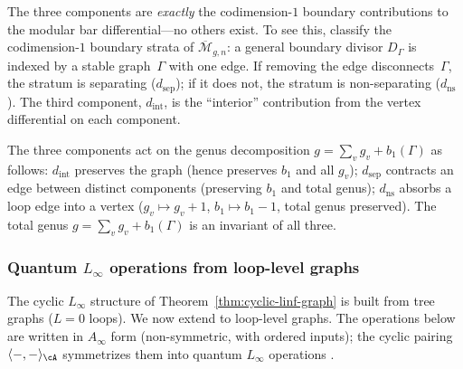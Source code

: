 \begin{remark}
\label{rem:genus-bookkeeping}
The three components are \emph{exactly} the codimension-$1$ boundary
contributions to the modular bar differential---no others exist.
To see this, classify the codimension-$1$ boundary strata of
$\overline{\mathcal{M}}_{g,n}$: a general boundary divisor $D_\Gamma$
is indexed by a stable graph~$\Gamma$ with one edge.
If removing the edge disconnects~$\Gamma$, the stratum is separating
($d_{\mathrm{sep}}$); if it does not, the stratum is non-separating
($d_{\mathrm{ns}}$).  The third component, $d_{\mathrm{int}}$, is
the ``interior'' contribution from the vertex differential on each
component.

The three components act on the genus decomposition
$g = \sum_v g_v + b_1(\Gamma)$ as follows:
$d_{\mathrm{int}}$ preserves the graph
(hence preserves $b_1$ and all $g_v$);
$d_{\mathrm{sep}}$ contracts an edge between distinct components
(preserving $b_1$ and total genus);
$d_{\mathrm{ns}}$ absorbs a loop edge into a vertex
($g_v \mapsto g_v + 1$, $b_1 \mapsto b_1 - 1$, total
genus preserved).
The total genus $g = \sum_v g_v + b_1(\Gamma)$ is an invariant
of all three.
\end{remark}

\subsubsection{Quantum \texorpdfstring{$L_\infty$}{L-infinity} operations from loop-level graphs}
\label{subsubsec:quantum-linf-from-graphs}

The cyclic $L_\infty$ structure of
Theorem~\ref{thm:cyclic-linf-graph} is built from tree graphs
($L = 0$ loops).  We now extend to loop-level graphs.
The operations below are written in $A_\infty$ form
(non-symmetric, with ordered inputs); the cyclic pairing
$\langle -, - \rangle_\cA$ symmetrizes them into quantum
$L_\infty$ operations \cite{BL15, Markl06}.

